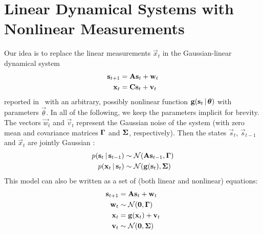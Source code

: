 \section{Linear Dynamical Systems with Nonlinear Measurements}
	Our idea is to replace the linear measurements \( \vec{x}_t \) in the Gaussian-linear dynamical system
	\begin{align*}
		\boldsymbol{\mathrm{s}}_{t + 1} & = \boldsymbol{\mathrm{A}} \boldsymbol{\mathrm{s}}_t + \boldsymbol{\mathrm{w}}_t \\
		\boldsymbol{\mathrm{x}}_t       & = \boldsymbol{\mathrm{C}} \boldsymbol{\mathrm{s}}_t + \boldsymbol{\mathrm{v}}_t
	\end{align*}
	reported in~\cite{ghahramaniParameterEstimationLinear1996} with an arbitrary, possibly nonlinear function \( \boldsymbol{\mathrm{g}}(\boldsymbol{\mathrm{s}}_t \,\vert\, \boldsymbol{\mathrm{\theta}}) \) with parameters \( \vec{\theta} \). In all of the following, we keep the parameters implicit for brevity. The vectors \( \vec{w}_t \) and \( \vec{v}_t \)	represent the Gaussian noise of the system (with zero mean and covariance matrices \( \boldsymbol{\mathrm{\Gamma}} \) and \( \boldsymbol{\mathrm{\Sigma}} \), respectively). Then the states \( \vec{s}_t \), \( \vec{s}_{t - 1} \) and \( \vec{x}_t \) are jointly Gaussian \cite{minkaHiddenMarkovModels1999}:
	\begin{align*}
		p(\boldsymbol{\mathrm{s}}_t \,\vert\, \boldsymbol{\mathrm{s}}_{t - 1}) &\sim \mathcal{N}(\boldsymbol{\mathrm{A}} \boldsymbol{\mathrm{s}}_{t - 1}, \boldsymbol{\mathrm{\Gamma}}) \\
		p(\boldsymbol{\mathrm{x}}_t \,\vert\, \boldsymbol{\mathrm{s}}_t)       &\sim \mathcal{N}(\boldsymbol{\mathrm{g}}(\boldsymbol{\mathrm{s}}_t), \boldsymbol{\mathrm{\Sigma}})
	\end{align*}
	This model can also be written as a set of (both linear and nonlinear) equations:
	\begin{align*}
		\boldsymbol{\mathrm{s}}_{t + 1} & =    \boldsymbol{\mathrm{A}} \boldsymbol{\mathrm{s}}_t + \boldsymbol{\mathrm{w}}_t          \\
		\boldsymbol{\mathrm{w}}_t       & \sim \mathcal{N}(\boldsymbol{\mathrm{0}}, \boldsymbol{\mathrm{\Gamma}})   \\
		\boldsymbol{\mathrm{x}}_t       & =    \boldsymbol{\mathrm{g}}(\boldsymbol{\mathrm{x}}_t) + \boldsymbol{\mathrm{v}}_t \\
		\boldsymbol{\mathrm{v}}_t       & \sim \mathcal{N}(\boldsymbol{\mathrm{0}}, \boldsymbol{\mathrm{\Sigma}})
	\end{align*}
	
